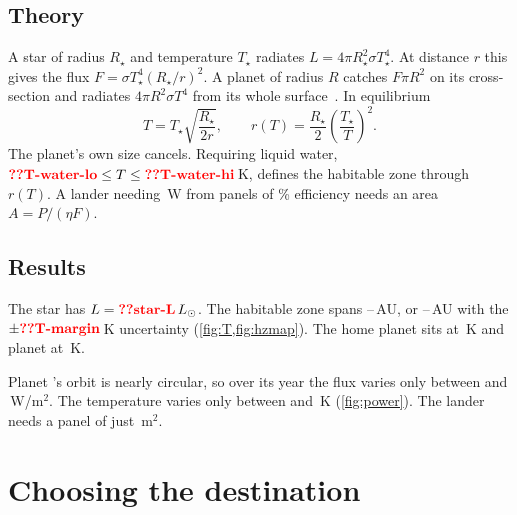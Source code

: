 \documentclass[aps,prd,twocolumn,nofootinbib,floatfix,superscriptaddress]{revtex4-2}
\begin{document}
\subsection{Theory}
A star of radius $R_\star$ and temperature $T_\star$ radiates $L=4\pi R_\star^2\sigma T_\star^4$.
At distance $r$ this gives the flux $F=\sigma T_\star^4(R_\star/r)^2$.
A planet of radius $R$ catches $F\pi R^2$ on its cross-section and radiates $4\pi R^2\sigma T^4$ from its whole surface~\cite{carroll2017}.
In equilibrium
\begin{equation}
  T = T_\star\sqrt{\frac{R_\star}{2r}}, \qquad r(T)=\frac{R_\star}{2}\left(\frac{T_\star}{T}\right)^2. \label{eq:T}
\end{equation}
The planet's own size cancels.
Requiring liquid water, $\val{T-water-lo}\le T\le\val{T-water-hi}$\,K, defines the habitable zone through $r(T)$.
A lander needing \,W from panels of \% efficiency needs an area $A=P/(\eta F)$.

\subsection{Results}
The star has $L=\val{star-L}\,L_\odot$.
The habitable zone spans --\,AU, or --\,AU with the $\pm\val{T-margin}$\,K uncertainty (\cref{fig:T,fig:hzmap}).
The home planet sits at \,K and planet  at \,K.

Planet 's orbit is nearly circular, so over its year the flux varies only between  and \,W/m$^2$.
The temperature varies only between  and \,K (\cref{fig:power}).
The lander needs a panel of just \,m$^2$.


\section{Choosing the destination}\label{sec:dest}
\end{document}
